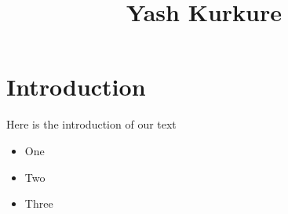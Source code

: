 \documentclass[12pt]{article}
\title{Yash Kurkure}
\date{}
\begin{document}
\maketitle


\section*{Introduction}

Here is the introduction of our text

\begin{itemize}

\item One

\item Two

\item Three

\end{itemize}
\end{document}
